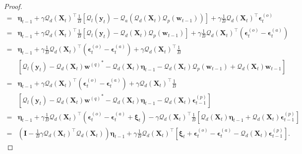 \documentclass[11pt, letterpaper]{article}
\begin{document}
\begin{proof}
\begin{equation*}
\begin{aligned}
            =&\boldsymbol{\eta}_{t-1}+\gamma \mathcal{Q}_d(\mathbf{X}_t)^\top \frac{1}{B}\left[\mathcal{Q}_l(\mathbf{y}_t)-\mathcal{Q}_a\left(\mathcal{Q}_d(\mathbf{X}_t)\mathcal{Q}_p(\mathbf{w}_{t-1})\right)\right]+\gamma \frac{1}{B}\mathcal{Q}_d(\mathbf{X}_t)^\top \boldsymbol{\epsilon}_t^{(o)}\\
            =&\boldsymbol{\eta}_{t-1}+\gamma \mathcal{Q}_d(\mathbf{X}_t)^\top \frac{1}{B}\left[\mathcal{Q}_l(\mathbf{y}_t)-\mathcal{Q}_d(\mathbf{X}_t)\mathcal{Q}_p(\mathbf{w}_{t-1})\right]+\gamma \frac{1}{B}\mathcal{Q}_d(\mathbf{X}_t)^\top (\boldsymbol{\epsilon}_t^{(o)}-\boldsymbol{\epsilon}_t^{(a)})\\
            =&\boldsymbol{\eta}_{t-1}+\gamma \frac{1}{B}\mathcal{Q}_d(\mathbf{X}_t)^\top (\boldsymbol{\epsilon}_t^{(o)}-\boldsymbol{\epsilon}_t^{(a)})+\gamma \mathcal{Q}_d(\mathbf{X}_t)^\top \frac{1}{B}\\
            &\left[\mathcal{Q}_l(\mathbf{y}_t)-\mathcal{Q}_d(\mathbf{X}_t){\mathbf{w}^{(q)}}^*-\mathcal{Q}_d(\mathbf{X}_t)\boldsymbol{\eta}_{t-1}-\mathcal{Q}_d(\mathbf{X}_t)\mathcal{Q}_p(\mathbf{w}_{t-1})+\mathcal{Q}_d(\mathbf{X}_t)\mathbf{w}_{t-1}\right]\\
            =&\boldsymbol{\eta}_{t-1}+\gamma \mathcal{Q}_d(\mathbf{X}_t)^\top (\boldsymbol{\epsilon}_t^{(o)}-\boldsymbol{\epsilon}_t^{(a)})+\gamma \mathcal{Q}_d(\mathbf{X}_t)^\top \frac{1}{B}\\
            &\left[\mathcal{Q}_l(\mathbf{y}_t)-\mathcal{Q}_d(\mathbf{X}_t){\mathbf{w}^{(q)}}^*-\mathcal{Q}_d(\mathbf{X}_t)\boldsymbol{\eta}_{t-1}-\mathcal{Q}_d(\mathbf{X}_t)\boldsymbol{\epsilon}_{t-1}^{(p)}\right]\\
            =&\boldsymbol{\eta}_{t-1}+\gamma \frac{1}{B}\mathcal{Q}_d(\mathbf{X}_t)^\top (\boldsymbol{\epsilon}_t^{(o)}-\boldsymbol{\epsilon}_t^{(a)}+\boldsymbol{\xi}_t)-\gamma \mathcal{Q}_d(\mathbf{X}_t)^\top \frac{1}{B}\left[\mathcal{Q}_d(\mathbf{X}_t)\boldsymbol{\eta}_{t-1}+\mathcal{Q}_d(\mathbf{X}_t)\boldsymbol{\epsilon}_{t-1}^{(p)}\right]\\
            =&\left(\mathbf{I}-\frac{1}{B}\gamma {\mathcal{Q}_d(\mathbf{X}_t)}^\top \mathcal{Q}_d(\mathbf{X}_t) \right)\boldsymbol{\eta}_{t-1}+\gamma\frac{1}{B}{\mathcal{Q}_d(\mathbf{X}_t)}^\top \left[\boldsymbol{\xi}_t+\boldsymbol{\epsilon}_t^{(o)}-\boldsymbol{\epsilon}_t^{(a)}-\mathcal{Q}_d(\mathbf{X}_t)\boldsymbol{\epsilon}_{t-1}^{(p)}\right].
        \end{aligned}
    \end{equation*}
\end{proof}
\end{document}
